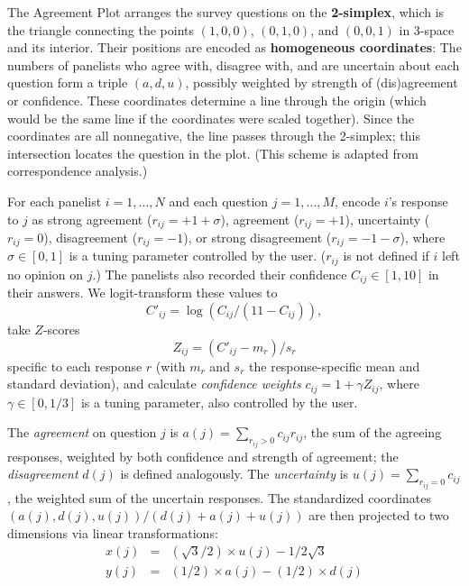 \documentclass{article}
\begin{document}
The Agreement Plot arranges the survey questions on the {\bf 2-simplex}, which is the triangle connecting the points \((1,0,0)\), \((0,1,0)\), and \((0,0,1)\) in 3-space and its interior. Their positions are encoded as {\bf homogeneous coordinates}: The numbers of panelists who agree with, disagree with, and are uncertain about each question form a triple \((a,d,u)\), possibly weighted by strength of (dis)agreement or confidence. These coordinates determine a line through the origin (which would be the same line if the coordinates were scaled together). Since the coordinates are all nonnegative, the line passes through the 2-simplex; this intersection locates the question in the plot. (This scheme is adapted from correspondence analysis.)

For each panelist \(i=1,\ldots,N\) and each question \(j=1,\ldots,M\), encode \(i\)'s response to \(j\) as strong agreement (\(r_{ij}=+1+\sigma\)), agreement (\(r_{ij}=+1\)), uncertainty (\(r_{ij}=0\)), disagreement (\(r_{ij}=-1\)), or strong disagreement (\(r_{ij}=-1-\sigma\)), where \(\sigma\in[0,1]\) is a tuning parameter controlled by the user. (\(r_{ij}\) is not defined if \(i\) left no opinion on \(j\).) The panelists also recorded their confidence \(C_{ij}\in[1,10]\) in their answers. We logit-transform these values to
\[C'_{ij}=\log({C_{ij}}/{(11-C_{ij})}),\]
take \(Z\)-scores
\[Z_{ij}=(C'_{ij}-m_r)/s_r\]
specific to each response \(r\) (with \(m_r\) and \(s_r\) the response-specific mean and standard deviation), and calculate {\em confidence weights} \(c_{ij}=1+\gamma Z_{ij}\), where \(\gamma\in[0,1/3]\) is a tuning parameter, also controlled by the user.

The {\em agreement} on question \(j\) is \(a(j)=\sum_{r_{ij}>0}{c_{ij}r_{ij}}\), the sum of the agreeing responses, weighted by both confidence and strength of agreement; the {\em disagreement} \(d(j)\) is defined analogously. The {\em uncertainty} is \(u(j)=\sum_{r_{ij}=0}{c_{ij}}\), the weighted sum of the uncertain responses. The standardized coordinates \((a(j),d(j),u(j))/(d(j)+a(j)+u(j))\) are then projected to two dimensions via linear transformations:
\begin{eqnarray*}
x(j) &= &({\sqrt{3}}/{2})\times u(j) - {1}/{2\sqrt{3}} \\
y(j) &= &({1}/{2})\times a(j) - ({1}/{2})\times d(j)
\end{eqnarray*}
\end{document}
